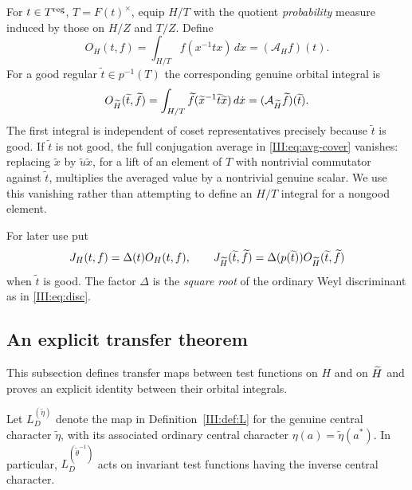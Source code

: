 For $t\in T^{\mathrm{reg}}$, $T=F(t)^\times$, equip $H/T$ with the quotient
\emph{probability} measure induced by those on $H/Z$ and $T/Z$. Define
\begin{equation}\label{III:eq:ordinary-O}
O_H(t,f)=\int_{H/T}f(x^{-1}tx)\,d\dot x
           =(\mathcal A_Hf)(t).
\end{equation}
For a good regular $\widetilde t\in p^{-1}(T)$ the corresponding genuine
orbital integral is
\begin{equation}\label{III:eq:covered-O}
O_{\widetilde H}(\widetilde t,\widetilde f)
=\int_{H/T}\widetilde f
  (\widetilde x^{-1}\widetilde t\widetilde x)\,d\dot x
=(\mathcal A_{\widetilde H}\widetilde f)(\widetilde t).
\end{equation}
The first integral is independent of coset representatives precisely because
$\widetilde t$ is good. If $\widetilde t$ is not good, the full conjugation
average in \eqref{III:eq:avg-cover} vanishes: replacing $\widetilde x$ by
$\widetilde u\widetilde x$, for a lift of an element of $T$ with nontrivial
commutator against $\widetilde t$, multiplies the averaged value by a
nontrivial genuine scalar. We use this vanishing rather than attempting to
define an $H/T$ integral for a nongood element.

For later use put
\begin{equation}\label{III:eq:normalized-O}
J_H(t,f)=\Delta(t)O_H(t,f),\qquad
J_{\widetilde H}(\widetilde t,\widetilde f)
=\Delta(p(\widetilde t))O_{\widetilde H}(\widetilde t,\widetilde f)
\end{equation}
when $\widetilde t$ is good. The factor $\Delta$ is the \emph{square root}
of the ordinary Weyl discriminant as in \eqref{III:eq:disc}.

\subsection{An explicit transfer theorem}
This subsection defines transfer maps between test functions on $H$ and on $\widetilde H$ and proves an explicit identity between their orbital integrals.

Let $L_D^{(\widetilde\eta)}$ denote the map in
Definition~\ref{III:def:L} for the genuine central character
$\widetilde\eta$, with its associated ordinary central character
$\eta(a)=\widetilde\eta(a^*)$. In particular,
$L_D^{(\widetilde\theta^{-1})}$ acts on invariant test functions
having the inverse central character.

